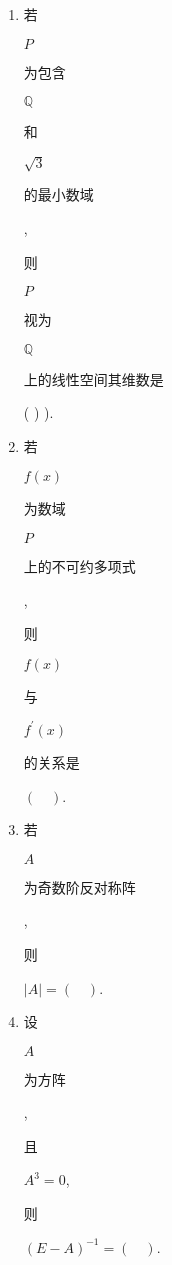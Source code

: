 \documentclass[10pt]{article}
\begin{document}
\begin{enumerate}
  \item \begin{CJK}{UTF8}{mj}若\end{CJK} $P$ \begin{CJK}{UTF8}{mj}为包含\end{CJK} $\mathbb{Q}$ \begin{CJK}{UTF8}{mj}和\end{CJK} $\sqrt{3}$ \begin{CJK}{UTF8}{mj}的最小数域\end{CJK}, \begin{CJK}{UTF8}{mj}则\end{CJK} $P$ \begin{CJK}{UTF8}{mj}视为\end{CJK} $\mathbb{Q}$ \begin{CJK}{UTF8}{mj}上的线性空间其维数是\end{CJK} ( ) ).

  \item \begin{CJK}{UTF8}{mj}若\end{CJK} $f(x)$ \begin{CJK}{UTF8}{mj}为数域\end{CJK} $P$ \begin{CJK}{UTF8}{mj}上的不可约多项式\end{CJK}, \begin{CJK}{UTF8}{mj}则\end{CJK} $f(x)$ \begin{CJK}{UTF8}{mj}与\end{CJK} $f^{\prime}(x)$ \begin{CJK}{UTF8}{mj}的关系是\end{CJK} $(\quad)$.

  \item \begin{CJK}{UTF8}{mj}若\end{CJK} $A$ \begin{CJK}{UTF8}{mj}为奇数阶反对称阵\end{CJK}, \begin{CJK}{UTF8}{mj}则\end{CJK} $|A|=(\quad)$.

  \item \begin{CJK}{UTF8}{mj}设\end{CJK} $A$ \begin{CJK}{UTF8}{mj}为方阵\end{CJK}, \begin{CJK}{UTF8}{mj}且\end{CJK} $A^{3}=0$, \begin{CJK}{UTF8}{mj}则\end{CJK} $(E-A)^{-1}=(\quad)$.


\end{enumerate}
\end{document}
